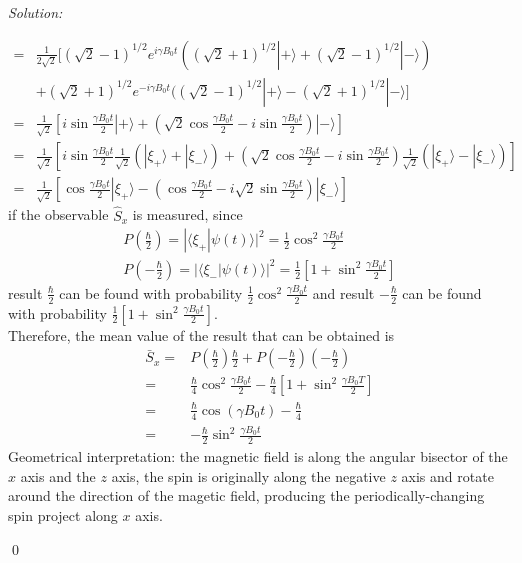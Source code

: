 \documentclass[12pt,a4paper]{article}
\newenvironment{sol}
    {\emph{Solution:}
    }
    {
    \qed
    }
\begin{document}
\begin{sol}
\begin{itemize}
\begin{align}
\nonumber=&\frac{1}{2\sqrt{2}}[(\sqrt{2}-1)^{1/2}e^{i\gamma B_0t}((\sqrt{2}+1)^{1/2}|+\rangle+(\sqrt{2}-1)^{1/2}|-\rangle)\\
\nonumber&+(\sqrt{2}+1)^{1/2}e^{-i\gamma B_0t}((\sqrt{2}-1)^{1/2}|+\rangle-(\sqrt{2}+1)^{1/2}|-\rangle]\\
\nonumber=&\frac{1}{\sqrt{2}}[i\sin\frac{\gamma B_0t}{2}|+\rangle+(\sqrt{2}\cos\frac{\gamma B_0t}{2}-i\sin\frac{\gamma B_0t}{2})|-\rangle]\\
\nonumber=&\frac{1}{\sqrt{2}}[i\sin\frac{\gamma B_0t}{2}\frac{1}{\sqrt{2}}(|\xi_+\rangle+|\xi_-\rangle)+(\sqrt{2}\cos\frac{\gamma B_0t}{2}-i\sin\frac{\gamma B_0t}{2})\frac{1}{\sqrt{2}}(|\xi_+\rangle-|\xi_-\rangle)]\\
=&\frac{1}{\sqrt{2}}[\cos\frac{\gamma B_0t}{2}|\xi_+\rangle-(\cos\frac{\gamma B_0t}{2}-i\sqrt{2}\sin\frac{\gamma B_0t}{2})|\xi_-\rangle]
\end{align}
if the observable $\hat{S}_x$ is measured, since
\begin{gather}
P(\frac{\hbar}{2})=|\langle\xi_+|\psi(t)\rangle|^2=\frac{1}{2}\cos^2\frac{\gamma B_0t}{2}\\
P(-\frac{\hbar}{2})=|\langle\xi_-|\psi(t)\rangle|^2=\frac{1}{2}[1+\sin^2\frac{\gamma B_0t}{2}]
\end{gather}
result $\frac{\hbar}{2}$ can be found with probability $\frac{1}{2}\cos^2\frac{\gamma B_0t}{2}$ and result $-\frac{\hbar}{2}$ can be found with probability $\frac{1}{2}[1+\sin^2\frac{\gamma B_0t}{2}]$.\\
Therefore, the mean value of the result that can be obtained is
\begin{align}
\nonumber\bar{S}_x=&P(\frac{\hbar}{2})\frac{\hbar}{2}+P(-\frac{\hbar}{2})(-\frac{\hbar}{2})\\
\nonumber=&\frac{\hbar}{4}\cos^2\frac{\gamma B_0t}{2}-\frac{\hbar}{4}[1+\sin^2\frac{\gamma B_0T}{2}]\\
\nonumber=&\frac{\hbar}{4}\cos(\gamma B_0t)-\frac{\hbar}{4}\\
=&-\frac{\hbar}{2}\sin^2\frac{\gamma B_0t}{2}
\end{align}
Geometrical interpretation: the magnetic field is along the angular bisector of the $x$ axis and the $z$ axis, the spin is originally along the negative $z$ axis and rotate around the direction of the magetic field, producing the periodically-changing spin project along $x$ axis.
\end{itemize}
\end{sol}
\end{document}

